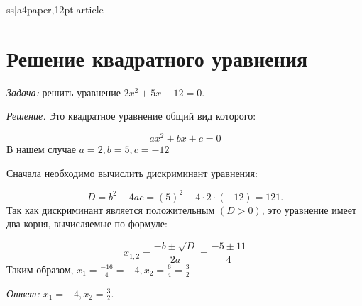 ss[a4paper,12pt]{article} 
\usepackage{cmap} 
\usepackage[T2A]{fontenc} 
\usepackage[utf8]{inputenc} 
\usepackage[english,russian]{babel}

 
\section{Решение квадратного уравнения}
\textit{Задача:} решить уравнение $2x^2 + 5x - 12 = 0$.

\textit{Решение.} Это квадратное уравнение общий вид которого:

\[ ax^2 + bx + c = 0 \] 
В нашем случае $a = 2, b = 5, c = -12$

Сначала необходимо вычислить дискриминант уравнения:

\[ D = b^2 - 4ac = (5)^2 - 4\cdot2\cdot(-12) = 121. \]
Так как дискриминант является положительным $(D>0)$, это уравнение имеет два корня, вычисляемые по формуле:

\[ x_{1,2} = \frac{-b \pm \sqrt{D}}{2a} =\frac{-5 \pm 11}{4}\]
Таким образом, $x_{1}=\frac {-16} {4}=-4, x_{2}=\frac {6} {4}=\frac {3} {2} $

\textit{Ответ: $x_{1}=-4, x_{2}=\frac {3} {2} $}.



